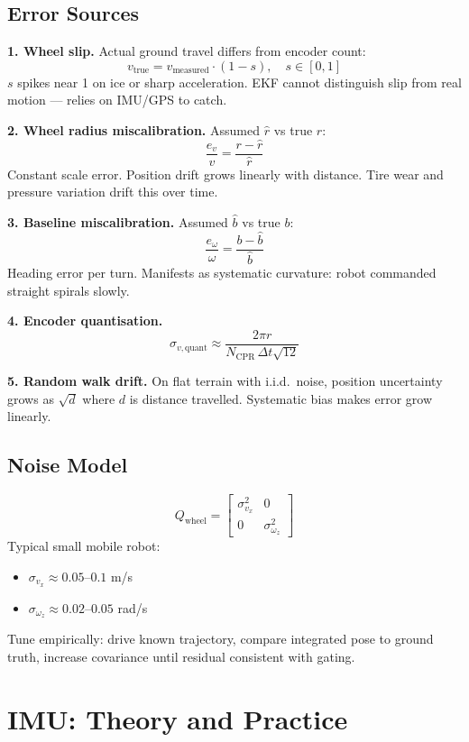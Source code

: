 \documentclass[11pt,a4paper]{article}
\begin{document}
\subsection{Error Sources}

\textbf{1. Wheel slip.} Actual ground travel differs from encoder count:
\[
v_{\text{true}} = v_{\text{measured}} \cdot (1 - s), \quad s \in [0, 1]
\]
$s$ spikes near 1 on ice or sharp acceleration. EKF cannot distinguish slip from real motion --- relies on IMU/GPS to catch.

\textbf{2. Wheel radius miscalibration.} Assumed $\hat{r}$ vs true $r$:
\[
\frac{e_v}{v} = \frac{r - \hat{r}}{\hat{r}}
\]
Constant scale error. Position drift grows linearly with distance. Tire wear and pressure variation drift this over time.

\textbf{3. Baseline miscalibration.} Assumed $\hat{b}$ vs true $b$:
\[
\frac{e_\omega}{\omega} = \frac{b - \hat{b}}{\hat{b}}
\]
Heading error per turn. Manifests as systematic curvature: robot commanded straight spirals slowly.

\textbf{4. Encoder quantisation.}
\[
\sigma_{v,\text{quant}} \approx \frac{2\pi r}{N_{\text{CPR}}\, \Delta t \sqrt{12}}
\]

\textbf{5. Random walk drift.} On flat terrain with i.i.d.\ noise, position uncertainty grows as $\sqrt{d}$ where $d$ is distance travelled. Systematic bias makes error grow linearly.

\subsection{Noise Model}

\[
Q_{\text{wheel}} = \begin{bmatrix}\sigma_{v_x}^2 & 0 \\ 0 & \sigma_{\omega_z}^2\end{bmatrix}
\]
Typical small mobile robot:
\begin{itemize}
\item $\sigma_{v_x} \approx 0.05$--$0.1$ m/s
\item $\sigma_{\omega_z} \approx 0.02$--$0.05$ rad/s
\end{itemize}
Tune empirically: drive known trajectory, compare integrated pose to ground truth, increase covariance until residual consistent with gating.

\section{IMU: Theory and Practice}
\end{document}
